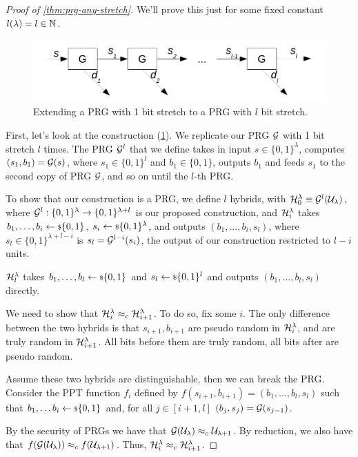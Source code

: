 \begin{proof}[Proof of \cref{thm:prg-any-stretch}]
	We'll prove this just for some fixed constant $l(\lambda) = l \in \mathbb{N}$.

	\begin{figure}
		\centering
		\includegraphics[width=0.8\linewidth]{drawings/prg-any-stretch.pdf}
		\caption{Extending a \acs{PRG} with 1 bit stretch to a \acs{PRG} with $l$ bit stretch. \label{fig:prg-any-stretch}}
	\end{figure}

	First, let's look at the construction (\cref{fig:prg-any-stretch}).
	We replicate our \ac{PRG} $\mathcal{G}$ with 1 bit stretch $l$ times.
	The \ac{PRG} $\mathcal{G}^{l}$ that we define takes in input $s \in \{0,1\}^{\lambda}$, computes $(s_1, b_1) = \mathcal{G}(s)$, where $s_1 \in \{0,1\}^{l}$ and $b_1 \in \{0,1\}$, outputs $b_1$ and feeds $s_1$ to the second copy of \ac{PRG} $\mathcal{G}$, and so on until the $l$-th \ac{PRG}.

	To show that our construction is a \ac{PRG}, we define $l$ hybrids, with $\mathcal{H}_0^{\lambda} \equiv \mathcal{G}^{l}(\mathcal{U}_{\lambda})$, where $\mathcal{G}^{l} : \{0,1\}^{\lambda} \to \{0,1\}^{\lambda + l}$ is our proposed construction, and $\mathcal{H}_i^{\lambda}$ takes $b_1, \dots, b_i \leftarrow {\scriptstyle \$} {\{0,1\}}$, $s_i \leftarrow {\scriptstyle \$} {\{0,1\}^{\lambda}}$, and outputs $(b_1, \dots, b_i, s_l)$, where $s_l \in \{0,1\}^{\lambda + l - i}$ is $s_l = \mathcal{G}^{l-i}(s_i)$, \ie the output of our construction restricted to $l-i$ units.

	$\mathcal{H}_l^{\lambda}$ takes $b_1, \dots, b_l \leftarrow {\scriptstyle \$} {\{0,1\}}$ and $s_l \leftarrow {\scriptstyle \$} {\{0,1\}^{l}}$ and outputs $(b_1, \dots, b_l, s_l)$ directly.

	We need to show that $\mathcal{H}_i^{\lambda} \approx_c \mathcal{H}_{i+1}^{\lambda}$.
	To do so, fix some $i$.
	The only difference between the two hybrids is that $s_{i+1}, b_{i+1}$ are pseudo random in $\mathcal{H}_{i}^{\lambda}$, and are truly random in $\mathcal{H}_{i+1}^{\lambda}$.
	All bits before them are truly random, all bits after are pseudo random.

	Assume these two hybrids are distinguishable, then we can break the \ac{PRG}.
	Consider the \ac{PPT} function $f_i$ defined by $f(s_{i+1},b_{i+1}) = (b_1, \dots, b_l, s_l)$ such that $b_1, \dots b_i \leftarrow {\scriptstyle \$} {\{0,1\}}$ and, for all $j \in [i+1, l]$ $(b_j, s_j) = \mathcal{G}(s_{j-1})$.

	By the security of \acp{PRG} we have that $\mathcal{G}(\mathcal{U}_{\lambda}) \approx_c \mathcal{U}_{\lambda+1}$.
	By reduction, we also have that $f(\mathcal{G}(\mathcal{U}_{\lambda})) \approx_c f(\mathcal{U}_{\lambda+1})$.
	Thus, $\mathcal{H}_{i}^{\lambda} \approx_c \mathcal{H}_{i+1}^{\lambda}$.
\end{proof}

